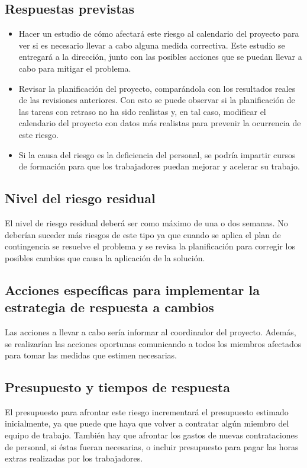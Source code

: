 \documentclass[11pt,a4paper,spanish,twoside]{book}
\begin{document}
\subsection{Respuestas previstas}
\begin{itemize}
\item Hacer un estudio de cómo afectará este riesgo
  al calendario del proyecto para ver si es necesario llevar a cabo alguna
  medida correctiva. Este estudio se entregará a la dirección, junto con las
  posibles acciones que se puedan llevar a cabo para mitigar el problema. 
\item Revisar la planificación del proyecto, comparándola con los resultados
  reales de las revisiones anteriores. Con esto se puede observar si la
  planificación de las tareas con retraso no ha sido realistas y, en tal caso,
  modificar el calendario del proyecto con datos más realistas para prevenir
  la ocurrencia de este riesgo.
\item Si la causa del riesgo es la deficiencia del personal, se podría
  impartir cursos de formación para que los trabajadores puedan mejorar y
  acelerar su trabajo. 
\end{itemize}

\subsection{Nivel del riesgo residual}
El nivel de riesgo residual deberá ser como máximo de una o dos semanas. No
deberían suceder más riesgos de este tipo ya que cuando se aplica el plan de 
contingencia se resuelve el problema y se revisa la planificación para
corregir los posibles cambios que causa la aplicación de la solución. 

\subsection{Acciones específicas para implementar la estrategia de respuesta
  a cambios}
Las acciones a llevar a cabo sería informar al coordinador
del proyecto. Además, se realizarían las acciones oportunas comunicando a
todos los miembros afectados para tomar las medidas que estimen necesarias. 

\subsection{Presupuesto y tiempos de respuesta}
El presupuesto para afrontar este riesgo incrementará el presupuesto estimado
inicialmente, ya que puede que haya que volver a contratar algún miembro del
equipo de trabajo. También hay que afrontar los gastos de nuevas
contrataciones de personal, si éstas fueran necesarias, o incluir presupuesto
para pagar las horas extras realizadas por los trabajadores. 
\end{document}
